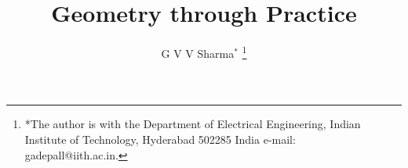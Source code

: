 \documentclass[journal,12pt,twocolumn]{IEEEtran}
\begin{document}
\def\putbox#1#2#3{\makebox[0in][l]{\makebox[#1][l]{}\raisebox{\baselineskip}[0in][0in]{\raisebox{#2}[0in][0in]{#3}}}}
     \def\rightbox#1{\makebox[0in][r]{#1}}
     \def\centbox#1{\makebox[0in]{#1}}
     \def\topbox#1{\raisebox{-\baselineskip}[0in][0in]{#1}}
     \def\midbox#1{\raisebox{-0.5\baselineskip}[0in][0in]{#1}}

\vspace{3cm}

\title{
	Geometry through Practice
}


%
%
%

\author{G V V Sharma$^{*}$%
\thanks{*The author is with the Department
of Electrical Engineering, Indian Institute of Technology, Hyderabad
502285 India e-mail:  gadepall@iith.ac.in.}%
}
% 
%
\end{document}
